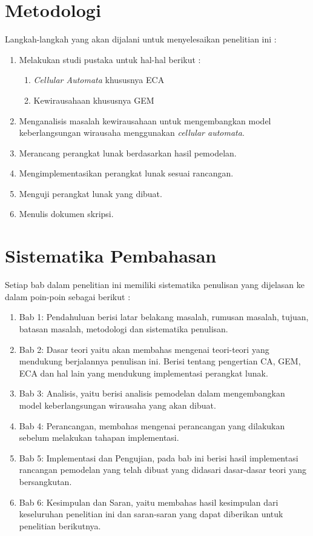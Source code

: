 \section{Metodologi}
\label{sec:metlit}
Langkah-langkah yang akan dijalani untuk menyelesaikan penelitian ini :
\begin{enumerate}
	\item Melakukan studi pustaka untuk hal-hal berikut :
		\begin{enumerate}
			\item \textit{Cellular Automata} khususnya ECA
			\item Kewirausahaan khususnya GEM
		\end{enumerate}
	\item Menganalisis masalah kewirausahaan untuk mengembangkan model keberlangsungan wirausaha menggunakan \textit{cellular automata}.
	\item Merancang perangkat lunak berdasarkan hasil pemodelan.
	\item Mengimplementasikan perangkat lunak sesuai rancangan.
	\item Menguji perangkat lunak yang dibuat.
	\item Menulis dokumen skripsi.
\end{enumerate}


\section{Sistematika Pembahasan}
\label{sec:sispem}
Setiap bab dalam penelitian ini memiliki sistematika penulisan yang dijelasan ke dalam poin-poin sebagai berikut :
\begin{enumerate}
	\item Bab 1: Pendahuluan berisi latar belakang masalah, rumusan masalah, tujuan, batasan masalah, metodologi dan sistematika penulisan.
	\item Bab 2: Dasar teori yaitu akan membahas mengenai teori-teori yang mendukung berjalannya penulisan ini. Berisi tentang pengertian CA, GEM, ECA dan hal lain yang mendukung implementasi perangkat lunak.
	\item Bab 3: Analisis, yaitu berisi analisis pemodelan dalam mengembangkan model keberlangsungan wirausaha yang akan dibuat.
	\item Bab 4: Perancangan, membahas mengenai perancangan yang dilakukan sebelum melakukan tahapan implementasi.
	\item Bab 5: Implementasi dan Pengujian, pada bab ini berisi hasil implementasi rancangan pemodelan yang telah dibuat yang didasari dasar-dasar teori yang bersangkutan.
	\item Bab 6: Kesimpulan dan Saran, yaitu membahas hasil kesimpulan dari keseluruhan penelitian ini dan saran-saran yang dapat diberikan untuk penelitian berikutnya.
\end{enumerate}



